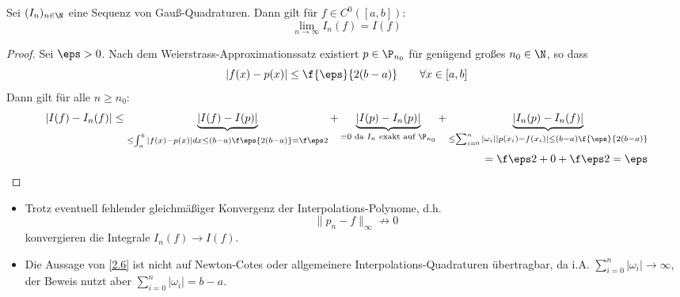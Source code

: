 \documentclass[11pt]{scrbook}
\begin{document}
\begin{st}[Konvergenz]
	\label{2.26}
	Sei $(I_n)_{n\in \N}$ eine Sequenz von Gauß-Quadraturen.
	Dann gilt für $f\in C^0([a,b])$:
	\[
		\lim_{n\to \infty} I_n(f) = I(f)
	\]
	\begin{proof}
		Sei $\eps > 0$.
		Nach dem Weierstrass-Approximationssatz existiert $p\in \P_{n_0}$ für genügend großes $n_0\in \N$, so dass
		\[
			|f(x) - p(x)| \le \f {\eps}{2(b-a)} \qquad \forall x\in [a,b]
		\]
		Dann gilt für alle $n\ge n_0$:
		\begin{align*}
			|I(f) - I_n(f)|
			\le \underbrace{|I(f) - I(p)|}_{\le \int_a^b |f(x) - p(x)| dx \le (b-a)\f \eps{2(b-a)}= \f \eps 2} 
			+ \underbrace{|I(p) - I_n(p)|}_{=0 \text{ da $I_n$ exakt auf $\P_{n_0}$}} 
			+ \underbrace{|I_n(p)-I_n(f)|}_{\le \sum_{i=0}^n |\omega_i||p(x_i)-f(x_i)| \le (b-a) \f {\eps}{2(b-a)} } \\
			= \f \eps 2 + 0 + \f \eps 2 = \eps
		\end{align*}
	\end{proof}
	\begin{note}
		\begin{itemize}
			\item
				Trotz eventuell fehlender gleichmäßiger Konvergenz der Interpolations-Polynome, d.h.
				\[
					\|p_n - f\|_\infty \not \to 0
				\]
				konvergieren die Integrale $I_n(f) \to I(f)$.
			\item
				Die Aussage von \ref{2.6} ist nicht auf Newton-Cotes oder allgemeinere Interpolations-Quadraturen übertragbar, da i.A. $\sum_{i=0}^n |\omega_i| \to \infty$, der Beweis nutzt aber $\sum_{i=0}^n |\omega_i| = b-a$.
		\end{itemize}
	\end{note}
\end{st}
\end{document}
